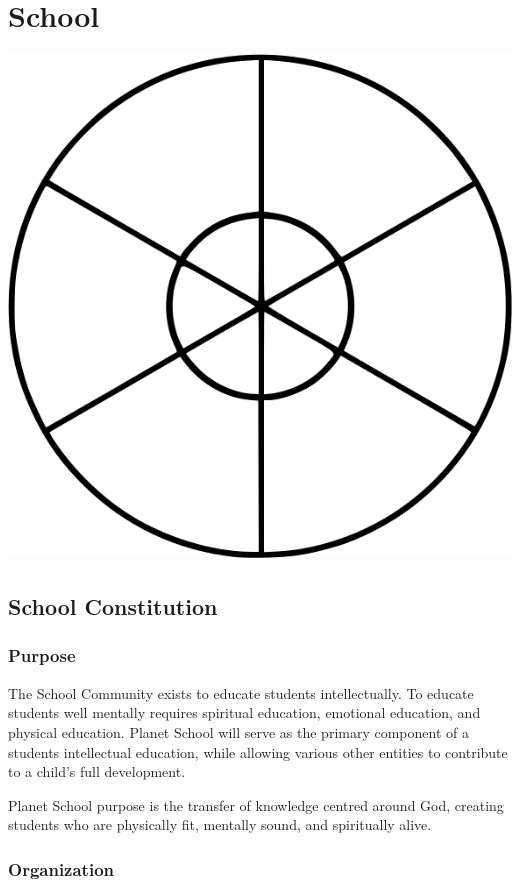 \documentclass[CSHFoundation.tex]{subfiles}
\begin{document}
\chapter{School}
\centerline{\includegraphics[scale=0.35]{6-Slogo.png}}
\section{School Constitution}
\subsection{Purpose}

The School Community exists to educate students intellectually. To educate students well mentally requires spiritual education, emotional education, and physical education. Planet School will serve as the primary component of a students intellectual education, while allowing various other entities to contribute to a child’s full development.

Planet School purpose is the transfer of knowledge centred around God, creating students who are physically fit, mentally sound, and spiritually alive.

\subsection{Organization}
\end{document}
